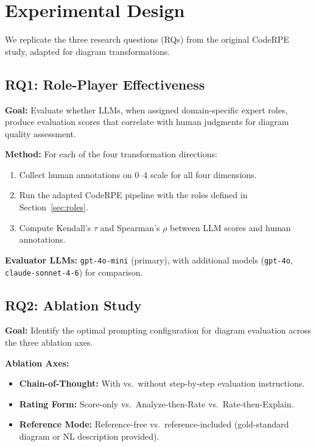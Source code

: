 \documentclass[lettersize,journal]{IEEEtran}
\begin{document}
\section{Experimental Design}
\label{sec:experimental-design}

We replicate the three research questions (RQs) from the original CodeRPE study, adapted for diagram transformations.

\subsection{RQ1: Role-Player Effectiveness}

\textbf{Goal:} Evaluate whether LLMs, when assigned domain-specific expert roles, produce evaluation scores that correlate with human judgments for diagram quality assessment.

\textbf{Method:} For each of the four transformation directions:
\begin{enumerate}
    \item Collect human annotations on 0--4 scale for all four dimensions.
    \item Run the adapted CodeRPE pipeline with the roles defined in Section~\ref{sec:roles}.
    \item Compute Kendall's $\tau$ and Spearman's $\rho$ between LLM scores and human annotations.
\end{enumerate}

\textbf{Evaluator LLMs:} \texttt{gpt-4o-mini} (primary), with additional models (\texttt{gpt-4o}, \texttt{claude-sonnet-4-6}) for comparison.

\subsection{RQ2: Ablation Study}

\textbf{Goal:} Identify the optimal prompting configuration for diagram evaluation across the three ablation axes.

\textbf{Ablation Axes:}
\begin{itemize}
    \item \textbf{Chain-of-Thought:} With vs.\ without step-by-step evaluation instructions.
    \item \textbf{Rating Form:} Score-only vs.\ Analyze-then-Rate vs.\ Rate-then-Explain.
    \item \textbf{Reference Mode:} Reference-free vs.\ reference-included (gold-standard diagram or NL description provided).
\end{itemize}
\end{document}
